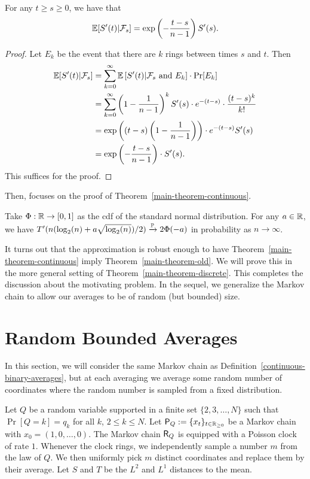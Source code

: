 \documentclass[12pt]{article}
\begin{document}
\begin{prop}
	For any $t \geq s \geq 0$, we have that 
	\[
		\mathbb{E}[S'(t) | \mathcal{F}_s ] = \exp \left ( - \frac{t-s}{n-1} \right ) S'(s).	
	\]
\end{prop}
\begin{proof}
	Let $E_k$ be the event that there are $k$ rings between times $s$ and $t$. Then 
	\begin{align*}
		\mathbb{E} [ S'(t) | \mathcal{F}_s ] & = \sum_{k = 0}^\infty \mathbb{E} \left [ S'(t) | \mathcal{F}_s \text{ and } E_k \right ] \cdot \Pr[E_k] \\
		& = \sum_{k = 0}^\infty \left ( 1 - \frac{1}{n-1} \right )^k S'(s) \cdot e^{-(t-s)} \cdot \frac{(t-s)^k}{k!} \\
		& = \exp \left (  (t-s) \left ( 1 - \frac{1}{n-1} \right ) \right ) \cdot e^{-(t-s)} S'(s) \\
		& = \exp \left ( - \frac{t-s}{n-1} \right ) \cdot S'(s). 
	\end{align*}
	This suffices for the proof. 
\end{proof}

Then, \cite{chatterjee2021phase} focuses on the proof of Theorem~\ref{main-theorem-continuous}. 

\begin{thm} \label{main-theorem-continuous}
	Take $\Phi : \mathbb{R} \to [0, 1]$ as the cdf of the standard normal distribution. For any $a \in \mathbb{R}$, we have $T'(n (\log_2(n) +a \sqrt{\log_2(n)})/2) \xrightarrow[]{\mathbb{P}} 2 \Phi(-a)$ in probability as $n \to \infty$. 
\end{thm}

It turns out that the approximation is robust enough to have Theorem~\ref{main-theorem-continuous} imply Theorem~\ref{main-theorem-old}. We will prove this in the more general setting of Theorem~\ref{main-theorem-discrete}. This completes the discussion about the motivating problem. In the sequel, we generalize the Markov chain to allow our averages to be of random (but bounded) size.  

\section{Random Bounded Averages}

In this section, we will consider the same Markov chain as Definition~\ref{continuous-binary-averages}, but at each averaging we average some random number of coordinates where the random number is sampled from a fixed distribution. 

\begin{defn} \label{main-markov-chain}
	Let $Q$ be a random variable supported in a finite set $\{2, 3, \ldots, N\}$ such that $\Pr[Q = k] = q_k$ for all $k$, $2 \leq k \leq N$. Let $\mathsf{P}_Q := \{x_t\}_{t \in \mathbb{R}_{\geq 0}}$ be a Markov chain with $x_0 = (1, 0, \ldots, 0)$. The Markov chain $\mathsf{R}_Q$ is equipped with a Poisson clock of rate $1$. Whenever the clock rings, we independently sample a number $m$ from the law of $Q$. We then uniformly pick $m$ distinct coordinates and replace them by their average. Let $S$ and $T$ be the $L^2$ and $L^1$ distances to the mean. 
\end{defn} 
\end{document}
